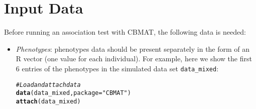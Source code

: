 \documentclass{article}\usepackage[]{graphicx}\usepackage[]{color}
\makeatletter
\newcommand{\hlstr}[1]{\textcolor[rgb]{0.192,0.494,0.8}{#1}}%
\newcommand{\hlcom}[1]{\textcolor[rgb]{0.678,0.584,0.686}{\textit{#1}}}%
\newcommand{\hlstd}[1]{\textcolor[rgb]{0.345,0.345,0.345}{#1}}%
\newcommand{\hlkwc}[1]{\textcolor[rgb]{0.333,0.667,0.333}{#1}}%
\newcommand{\hlkwd}[1]{\textcolor[rgb]{0.737,0.353,0.396}{\textbf{#1}}}%
\newenvironment{kframe}{%
 \def\at@end@of@kframe{}%
 \ifinner\ifhmode%
  \def\at@end@of@kframe{\end{minipage}}%
  \begin{minipage}{\columnwidth}%
 \fi\fi%
 \def\FrameCommand##1{\hskip\@totalleftmargin \hskip-\fboxsep
 \colorbox{shadecolor}{##1}\hskip-\fboxsep
     \hskip-\linewidth \hskip-\@totalleftmargin \hskip\columnwidth}%
 \MakeFramed {\advance\hsize-\width
   \@totalleftmargin\z@ \linewidth\hsize
   \@setminipage}}%
 {\par\unskip\endMakeFramed%
 \at@end@of@kframe}
\newenvironment{knitrout}{}{} %
\makeatother
\begin{document}
\section{Input Data}
\label{sec:Input}
Before running an association test with CBMAT, the following data is needed:
\begin{itemize}
\item \emph{Phenotypes}: phenotypes data should be present separately in the form of an R vector (one value for each individual). For example, here we show the first 6 entries of the phenotypes in the simulated data set \texttt{data\_mixed}:
\begin{knitrout}
\color{fgcolor}\begin{kframe}
\begin{alltt}
  \hlcom{#Load and attach data}
  \hlkwd{data}\hlstd{(data_mixed,}\hlkwc{package} \hlstd{=} \hlstr{"CBMAT"}\hlstd{)}
  \hlkwd{attach}\hlstd{(data_mixed)}


\end{alltt}
\end{kframe}
\end{knitrout}
\end{itemize}
\end{document}
